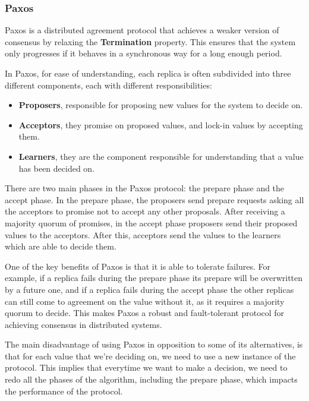 \documentclass[sigconf]{acmart}
\begin{document}
\subsubsection{Paxos} 

Paxos is a distributed agreement protocol that achieves a weaker version of consensus by relaxing the \textbf{Termination} property. This ensures that the system only progresses if it behaves in a synchronous way for a long enough period.

In Paxos, for ease of understanding, each replica is often subdivided into three different components, each with different responsibilities:

\begin{itemize}
    \item \textbf{Proposers}, responsible for proposing new values for the system to decide on.
    \item \textbf{Acceptors}, they promise on proposed values, and lock-in values by accepting them.
    \item \textbf{Learners}, they are the component responsible for understanding that a value has been decided on. 
\end{itemize}

There are two main phases in the Paxos protocol: the prepare phase and the accept phase. In the prepare phase, the proposers send prepare requests asking all the acceptors to promise not to accept any other proposals. After receiving a majority quorum of promises, in the accept phase proposers send their proposed values to the acceptors. After this, acceptors send the values to the learners which are able to decide them.

One of the key benefits of Paxos is that it is able to tolerate failures. For example, if a replica fails during the prepare phase its prepare will be overwritten by a future one, and if a replica fails during the accept phase the other replicas can still come to agreement on the value without it, as it requires a majority quorum to decide. This makes Paxos a robust and fault-tolerant protocol for achieving consensus in distributed systems.

The main disadvantage of using Paxos in opposition to some of its alternatives, is that for each value that we're deciding on, we need to use a new instance of the protocol. This implies that everytime we want to make a decision, we need to redo all the phases of the algorithm, including the prepare phase, which impacts the performance of the protocol. 
\end{document}
